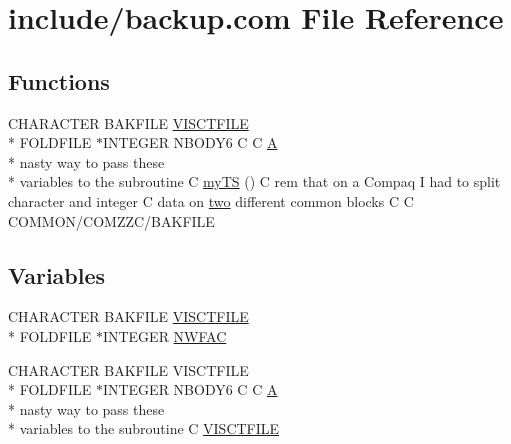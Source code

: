 \hypertarget{backup_8com}{\section{include/backup.com File Reference}
\label{backup_8com}
}
\subsection*{Functions}
\begin{DoxyCompactItemize}
\item 
C\-H\-A\-R\-A\-C\-T\-E\-R B\-A\-K\-F\-I\-L\-E \hyperlink{backup_8com_a95c1296e8e0de833d5ad9c330b97f734}{V\-I\-S\-C\-T\-F\-I\-L\-E} \\*
F\-O\-L\-D\-F\-I\-L\-E $\ast$I\-N\-T\-E\-G\-E\-R N\-B\-O\-D\-Y6 C C \hyperlink{ibc2_8com_ad2108d58343608772fff791c23da58f5}{A} \\*
nasty way to pass these \\*
variables to the subroutine C \hyperlink{backup_8com_a11cd648710b4262037820f234b3c55d7}{my\-T\-S} () C rem that on a Compaq I had to split character and integer C data on \hyperlink{time_8com_a08a78256f7bf7006662ac6a5bf3eb786}{two} different common blocks C C C\-O\-M\-M\-O\-N/C\-O\-M\-Z\-Z\-C/B\-A\-K\-F\-I\-L\-E
\end{DoxyCompactItemize}
\subsection*{Variables}
\begin{DoxyCompactItemize}
\item 
C\-H\-A\-R\-A\-C\-T\-E\-R B\-A\-K\-F\-I\-L\-E \hyperlink{backup_8com_a95c1296e8e0de833d5ad9c330b97f734}{V\-I\-S\-C\-T\-F\-I\-L\-E} \\*
F\-O\-L\-D\-F\-I\-L\-E $\ast$I\-N\-T\-E\-G\-E\-R \hyperlink{backup_8com_ae75931775f64e441b9b188902adc3ac4}{N\-W\-F\-A\-C}
\item 
C\-H\-A\-R\-A\-C\-T\-E\-R B\-A\-K\-F\-I\-L\-E V\-I\-S\-C\-T\-F\-I\-L\-E \\*
F\-O\-L\-D\-F\-I\-L\-E $\ast$I\-N\-T\-E\-G\-E\-R N\-B\-O\-D\-Y6 C C \hyperlink{ibc2_8com_ad2108d58343608772fff791c23da58f5}{A} \\*
nasty way to pass these \\*
variables to the subroutine C \hyperlink{backup_8com_a95c1296e8e0de833d5ad9c330b97f734}{V\-I\-S\-C\-T\-F\-I\-L\-E}
\end{DoxyCompactItemize}


